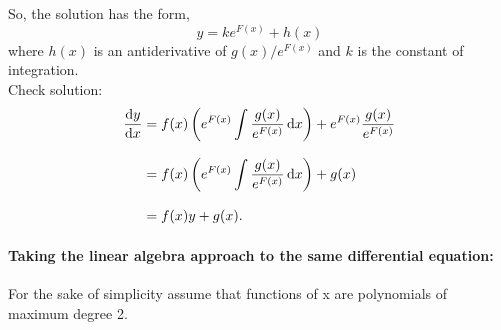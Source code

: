 \documentclass[MathsNotesBase.tex]{subfiles}
\begin{document}
{		So, the solution has the form,
		\[ y = ke^{F(x)} + h(x) \]
		where $h(x)$ is an antiderivative of ${ g(x)/e^{F(x)} }$ and $k$ is the constant of integration.\\
		
		Check solution:
		\begin{align*}
		\frac{\dif y}{\dif x} &= f(x)\left(e^{F(x)}\int \frac{g(x)}{e^{F(x)}} \dif x\right) + e^{F(x)}\frac{g(x)}{e^{F(x)}} \\[8pt]
		&= f(x)\left(e^{F(x)}\int \frac{g(x)}{e^{F(x)}} \dif x\right) + g(x) \\[8pt]
		&= f(x)y + g(x).
		\end{align*}
		
	
		\paragraph{Taking the linear algebra approach to the same differential equation:} For the sake of simplicity assume that functions of x are polynomials of maximum degree 2.
	
}
\end{document}
